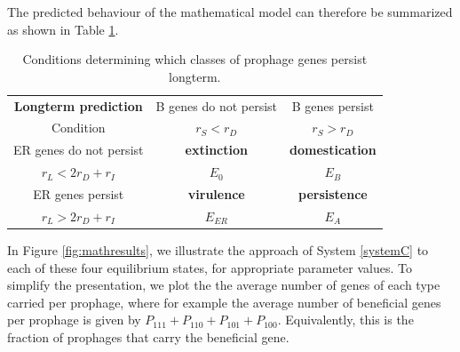 The predicted behaviour of the mathematical model can therefore be summarized as shown in Table \ref{tab:conditions}.

\renewcommand{\baselinestretch}{1}
\begin{table}
\centering
\begin{tabular}{| c | c | c |}
\hline
{\bf Longterm prediction} & B genes do not persist & B genes persist \\
Condition & $r_S<r_D$ & $r_S > r_D$ \\
\hline
ER genes do not persist & {\bf extinction} &  {\bf domestication} \\
$r_L < 2r_D + r_I$ &  $E_0$ & $E_B$ \\
\hline
ER genes persist & {\bf virulence} & {\bf persistence} \\
$r_L > 2r_D + r_I$ &  $E_{ER}$ & $E_A$ \\
\hline
\end{tabular}
\caption{Conditions determining which classes of prophage genes persist longterm.}
\label{tab:conditions}
\end{table}
\renewcommand{\baselinestretch}{2}

In Figure \ref{fig:mathresults}, we illustrate the approach of System \ref{systemC} to each of these four equilibrium states, for appropriate parameter values.  To simplify the presentation, we plot the the average number of genes of each type carried per prophage, where for example the average number of beneficial genes per prophage is given by $P_{111} + P_{110} + P_{101} + P_{100}$.  Equivalently, this is the fraction of prophages that carry the beneficial gene.

